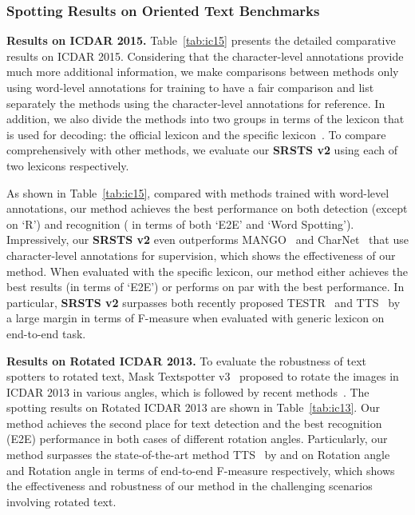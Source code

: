 \subsubsection{Spotting Results on Oriented Text Benchmarks}
\smallskip\noindent\textbf{Results on ICDAR 2015.}
Table~\ref{tab:ic15} presents the detailed comparative results on ICDAR 2015. Considering that the character-level annotations provide much more additional information, we make comparisons between methods only using word-level annotations for training to have a fair comparison and list separately the methods using the character-level annotations for reference. In addition, we also divide the methods into two groups in terms of the lexicon that is used for decoding: the official lexicon and the specific lexicon~\cite{liao2019mask}. To compare comprehensively with other methods, we evaluate our \textbf{SRSTS v2} using each of two lexicons respectively.

As shown in Table~\ref{tab:ic15}, compared with methods trained with word-level annotations, our method achieves the best performance on both detection (except on `R') and recognition ( in terms of both `E2E' and `Word Spotting'). Impressively, our \textbf{SRSTS v2} even outperforms MANGO~\cite{qiao2020mango} and CharNet~\cite{xing2019convolutional} that use character-level annotations for supervision, which shows the effectiveness of our method. When evaluated with the specific lexicon, our method either achieves the best results (in terms of `E2E') or performs on par with the best performance. In particular, \textbf{SRSTS v2} surpasses both recently proposed TESTR~\cite{zhang2022text} and TTS~\cite{kittenplon2022towards} by a large margin in terms of F-measure when evaluated with generic lexicon on end-to-end task.



\smallskip\noindent\textbf{Results on Rotated ICDAR 2013.} To evaluate the robustness of text spotters to rotated text, Mask Textspotter v3~\cite{liao2020mask} proposed to rotate the images in ICDAR 2013 in various angles, which is followed by recent methods~\cite{huang2022swintextspotter, kittenplon2022towards}. The spotting results on Rotated ICDAR 2013 are shown in Table~\ref{tab:ic13}. Our method achieves the second place for text detection and the best recognition (E2E) performance in both cases of different rotation angles. Particularly, our method surpasses the state-of-the-art method TTS~\cite{kittenplon2022towards} by  and  on Rotation angle  and Rotation angle  in terms of end-to-end F-measure respectively, which shows the effectiveness and robustness of our method in the challenging scenarios involving rotated text.


